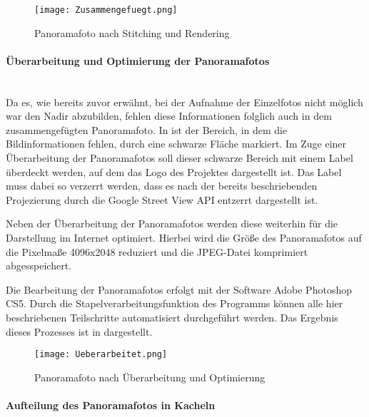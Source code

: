 \begin{figure}[htb]
\centering
\texttt{[image: Zusammengefuegt.png]}
\caption[Panoramafoto nach Stitching und Rendering]{Panoramafoto nach Stitching
und Rendering\protect\footnotemark}
\label{fig:Zusammengefuegt}
\end{figure}

\paragraph{Überarbeitung und Optimierung der Panoramafotos} \hfill \\

Da es, wie bereits zuvor erwähnt, bei der Aufnahme der Einzelfotos nicht möglich
war den Nadir abzubilden, fehlen diese Informationen folglich auch in dem
zusammengefügten Pa\-no\-ra\-ma\-fo\-to. In  ist der
Bereich, in dem die Bildinformationen fehlen, durch eine schwarze Fläche
markiert. Im Zuge einer Überarbeitung der Panoramafotos soll dieser schwarze
Bereich mit einem Label überdeckt werden, auf dem das Logo des Projektes
dargestellt ist. Das Label muss dabei so verzerrt werden, dass es nach der
bereits beschriebenden Projezierung durch die Google Street View API entzerrt
dargestellt ist.

Neben der Überarbeitung der Panoramafotos werden diese weiterhin für die
Darstellung im Internet optimiert. Hierbei wird die Größe des Panoramafotos auf
die Pixelmaße 4096x2048 reduziert und die JPEG-Datei komprimiert abgesspeichert.

Die Bearbeitung der Panoramafotos erfolgt mit der Software Adobe Photoshop CS5.
Durch die Stapelverarbeitungsfunktion des Programms können alle hier
beschriebenen Teilschritte automatisiert durchgeführt werden. Das Ergebnis
dieses Prozesses ist in  dargestellt.

\begin{figure}[htb]
\centering
\texttt{[image: Ueberarbeitet.png]}
\caption[Panoramafoto nach Überarbeitung und Optimierung]{Panoramafoto nach
Überarbeitung und Optimierung\protect\footnotemark}
\label{fig:Ueberarbeitet}
\end{figure}

\paragraph{Aufteilung des Panoramafotos in Kacheln} \hfill \\

